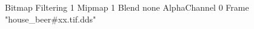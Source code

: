 {Bitmap
	{Filtering 1}
	{Mipmap 1}
	{Blend none}
	{AlphaChannel 0}
	{Frame "house_beer#xx.tif.dds"}
}
